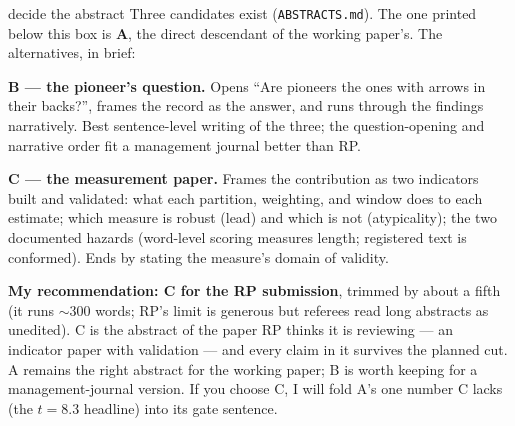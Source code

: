 \begin{ericbox}{decide the abstract}
Three candidates exist (\texttt{ABSTRACTS.md}). The one printed below this
box is \textbf{A}, the direct descendant of the working paper's. The
alternatives, in brief:

\textbf{B --- the pioneer's question.} Opens ``Are pioneers the ones with
arrows in their backs?'', frames the record as the answer, and runs through
the findings narratively. Best sentence-level writing of the three; the
question-opening and narrative order fit a management journal better than
RP.

\textbf{C --- the measurement paper.} Frames the contribution as two
indicators built and validated: what each partition, weighting, and window
does to each estimate; which measure is robust (lead) and which is not
(atypicality); the two documented hazards (word-level scoring measures
length; registered text is conformed). Ends by stating the measure's
domain of validity.

\textbf{My recommendation: C for the RP submission}, trimmed by about a
fifth (it runs $\sim$300 words; RP's limit is generous but referees read
long abstracts as unedited). C is the abstract of the paper RP thinks it is
reviewing --- an indicator paper with validation --- and every claim in it
survives the planned cut. A remains the right abstract for the working
paper; B is worth keeping for a management-journal version. If you choose
C, I will fold A's one number C lacks (the $t = 8.3$ headline) into its
gate sentence.
\end{ericbox}
